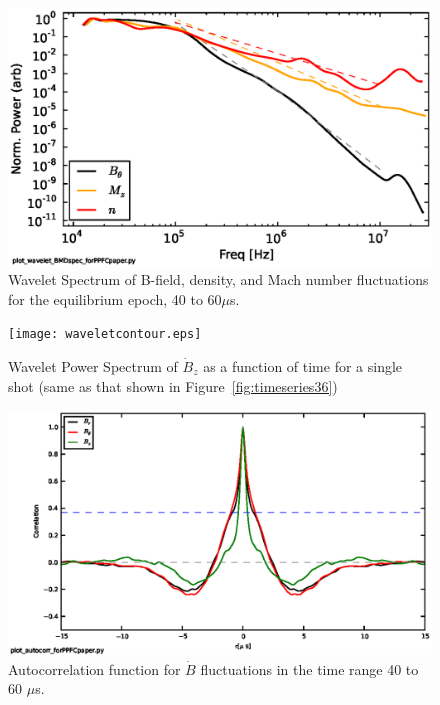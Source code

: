 \documentclass[12pt]{iopart}
\begin{document}
\begin{figure}[!htbp]
\centerline{
\includegraphics[width=16cm]{waveletspec.eps}}
\caption{\label{fig:waveletspec} Wavelet Spectrum of B-field, density, and Mach number fluctuations for the equilibrium epoch, 40 to 60$\mu$s.}
\end{figure}
\begin{figure}[!htbp]
\centerline{
\texttt{[image: waveletcontour.eps]}}
\caption{\label{fig:waveletcontour} Wavelet Power Spectrum of $\dot{B}_{z}$ as a function of time for a single shot (same as that shown in Figure~\ref{fig:timeseries36})}
\end{figure}
\begin{figure}[!htbp]
\centerline{
\includegraphics[width=16cm]{autocorr.eps}}
\caption{\label{fig:autocorr} Autocorrelation function for $\dot{B}$ fluctuations in the time range 40 to 60 $\mu$s.}
\end{figure}
\end{document}
